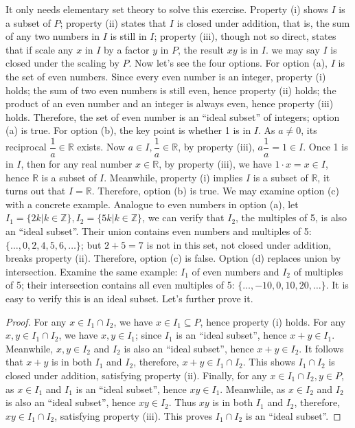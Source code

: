 \documentclass[b5paper]{article}
\begin{document}
It only needs elementary set theory to solve this exercise. Property (i) shows $I$ is a subset of $P$; property (ii) states that $I$ is closed under addition, that is, the sum of any two numbers in $I$ is still in $I$; property (iii), though not so direct, states that if scale any $x$ in $I$ by a factor $y$ in $P$, the result $xy$ is in $I$. we may say $I$ is closed under the scaling by $P$. Now let's see the four options. For option (a), $I$ is the set of even numbers. Since every even number is an integer, property (i) holds; the sum of two even numbers is still even, hence property (ii) holds; the product of an even number and an integer is always even, hence property (iii) holds. Therefore, the set of even number is an \enquote{ideal subset} of integers; option (a) is true. For option (b), the key point is whether 1 is in $I$. As $a \ne 0$, its reciprocal $\dfrac{1}{a} \in \mathbb{R}$ exists. Now $a \in I, \dfrac{1}{a} \in \mathbb{R}$, by property (iii), $a\dfrac{1}{a} = 1 \in I$. Once 1 is in $I$, then for any real number $x \in \mathbb{R}$, by property (iii), we have $1 \cdot x = x \in I$, hence $\mathbb{R}$ is a subset of $I$. Meanwhile, property (i) implies $I$ is a subset of $\mathbb{R}$, it turns out that $I = \mathbb{R}$. Therefore, option (b) is true. We may examine option (c) with a concrete example. Analogue to even numbers in option (a), let $I_1 = \{2k | k \in \mathbb{Z} \}, I_2 = \{5k | k \in \mathbb{Z} \}$, we can verify that $I_2$, the multiples of 5, is also an \enquote{ideal subset}. Their union contains even numbers and multiples of 5: $\{ \dotsc, 0, 2, 4, 5, 6, \dotsc\}$; but $2 + 5 = 7$ is not in this set, not closed under addition, breaks property (ii). Therefore, option (c) is false. Option (d) replaces union by intersection. Examine the same example: $I_1$ of even numbers and $I_2$ of multiples of 5; their intersection contains all even multiples of 5: $\{\dotsc, -10, 0, 10, 20, \dotsc\}$. It is easy to verify this is an ideal subset. Let's further prove it.

\begin{proof}
For any $x \in I_1 \cap I_2$, we have $x \in I_1 \subseteq P$, hence property (i) holds. For any $x, y \in I_1 \cap I_2$, we have $x, y \in I_1$; since $I_1$ is an \enquote{ideal subset}, hence $x + y \in I_1$. Meanwhile, $x, y \in I_2$ and $I_2$ is also an \enquote{ideal subset}, hence $x + y \in I_2$. It follows that $x + y$ is in both $I_1$ and $I_2$, therefore, $x + y \in I_1 \cap I_2$. This shows $I_1 \cap I_2$ is closed under addition, satisfying property (ii). Finally, for any $x \in I_1 \cap I_2, y \in P$, as $x \in I_1$ and $I_1$ is an \enquote{ideal subset}, hence $xy \in I_1$. Meanwhile, as $x \in I_2$ and $I_2$ is also an \enquote{ideal subset}, hence $xy \in I_2$. Thus $xy$ is in both $I_1$ and $I_2$, therefore, $xy \in I_1 \cap I_2$, satisfying property (iii). This proves $I_1 \cap I_2$ is an \enquote{ideal subset}.
\end{proof}
\end{document}

